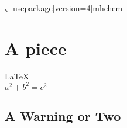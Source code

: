 、usepackage[version=4]{mhchem}

               
 
\section{A piece}          
\LaTeX \,\\ 
 $a^2+b^2=c^2$

\subsection{A Warning or Two}  


                 